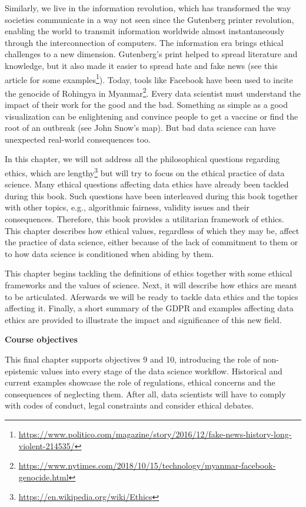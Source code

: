 \documentclass[
  12pt,
]{book}
\DeclareRobustCommand{\href}[2]{#2\footnote{\url{#1}}}
\begin{document}
Similarly, we live in the information revolution, which has transformed the way societies communicate in a way not seen since the Gutenberg printer revolution, enabling the world to transmit information worldwide almost instantaneously through the interconnection of computers. The information era brings ethical challenges to a new dimension. Gutenberg's print helped to spread literature and knowledge, but it also made it easier to spread hate and fake news (see \href{https://www.politico.com/magazine/story/2016/12/fake-news-history-long-violent-214535/}{this article for some examples}). Today, tools like Facebook have been used to incite the \href{https://www.nytimes.com/2018/10/15/technology/myanmar-facebook-genocide.html}{genocide of Rohingya in Myanmar}. Every data scientist must understand the impact of their work for the good and the bad. Something as simple as a good visualization can be enlightening and convince people to get a vaccine or find the root of an outbreak (see John Snow's map). But bad data science can have unexpected real-world consequences too.

In this chapter, we will not address all the philosophical questions regarding ethics, which are \href{https://en.wikipedia.org/wiki/Ethics}{lengthy} but will try to focus on the ethical practice of data science. Many ethical questions affecting data ethics have already been tackled during this book. Such questions have been interleaved during this book together with other topics, e.g., algorithmic fairness, validity issues and their consequences. Therefore, this book provides a utilitarian framework of ethics. This chapter describes how ethical values, regardless of which they may be, affect the practice of data science, either because of the lack of commitment to them or to how data science is conditioned when abiding by them.

This chapter begins tackling the definitions of ethics together with some ethical frameworks and the values of science. Next, it will describe how ethics are meant to be articulated. Aferwards we will be ready to tackle data ethics and the topics affecting it. Finally, a short summary of the GDPR and examples affecting data ethics are provided to illustrate the impact and significance of this new field.

\begin{simplebox}

\textbf{Course objectives}

This final chapter supports objectives 9 and 10, introducing the role of non-epistemic values into every stage of the data science workflow. Historical and current examples showcase the role of regulations, ethical concerns and the consequences of neglecting them. After all, data scientists will have to comply with codes of conduct, legal constraints and consider ethical debates.

\end{simplebox}
\end{document}
